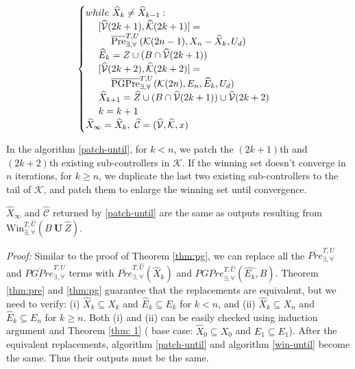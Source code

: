 {\begin{align}
\begin{split}
\begin{cases}
{\color{black} while \ \widehat{X}_{k}\not=\widehat{X}_{k-1}:}\\
\ \ \ \ [\widehat{\mathcal{V}}(2k+1),\widehat{\mathcal{K}}(2k+1)] = \\ \ \ \ \ \ \ \ \ \overline{\text{Pre}}_{\exists,\forall}^{T,U}(\mathcal{K}(2n-1),X_{n}-\widehat{X}_{k}, U_d)\\
\ \ \ \ \widehat{E}_k =  Z\cup (B\cap \widehat{\mathcal{V}}(2k+1))\\
\ \ \ \ [\widehat{\mathcal{V}}(2k+2),\widehat{\mathcal{K}}(2k+2)] =\\ 
\ \ \ \ \ \ \ \ \overline{\text{PGPre}}_{\exists,\forall}^{T,U}(\mathcal{K}(2n),E_n, \widehat{E}_k,U_d)\\
\ \ \ \ \widehat{X}_{k+1} =\widehat{Z}\cup (B\cap \widehat{\mathcal{V}}(2k+1)) \cup \widehat{\mathcal{V}}(2k+2)\\
\ \ \ \ {\color{black} k=k+1}\\
\widehat{X}_\infty = \widehat{X}_k,\ \widehat{\mathcal{C}} = (\widehat{\mathcal{V}},\widehat{\mathcal{K}},x)
\end{cases} \label{patch-until}
\end{split}
\end{align}}

In the algorithm \eqref{patch-until}, for $ k <n $, we patch the $ (2k+1) $th and $ (2k+2) $th existing sub-controllers in $ \mathcal{K} $. If the winning set doesn't converge in $ n $ iterations, for $ k\geq n $, we duplicate the last two existing sub-controllers to the tail of $ \mathcal{K} $, and patch them to enlarge the winning set until convergence. 
\begin{theorem}
	$ \widehat{X}_\infty $ and $ \widehat{\mathcal{C}} $ returned by \eqref{patch-until} are the same as outputs resulting from $ \text{Win}_{\exists,\forall}^{T,\widehat{U}}(B\mathbf{\ U\ }\widehat{Z}). $\label{thm:until}	
\end{theorem}

\emph{Proof:} Similar to the proof of Theorem \ref{thm:pg}, we can replace all the $ \overline{Pre}_{\exists,\forall}^{T,U} $ and $ \overline{PGPre}_{\exists,\forall}^{T,U} $ terms with $ \overline{Pre}_{\exists,\forall}^{T,\widehat{U}}(\widehat{X}_k) $ and $PGPre_{\exists,\forall}^{T,\widehat{U}}(\widehat{E_k},B)$. Theorem \ref{thm:pre} and \ref{thm:pg} guarantee that the replacements are equivalent, but we need to verify: (i) $ \widehat{X}_k \subseteq X_k $ and $ \widehat{E}_k \subseteq E_k $ for $ k < n $, and (ii) $ \widehat{X}_k \subseteq X_n $ and $ \widehat{E}_k \subseteq E_n $ for $ k\geq n $. Both (i) and (ii) can be easily checked using induction argument and Theorem \ref{thm: 1} ( base case: $ \widehat{X}_0\subseteq X_0 $ and $ \widehat{E}_1\subseteq E_1 $). After the equivalent replacements, algorithm \eqref{patch-until} and algorithm \eqref{win-until} become the same. Thus their outputs must be the same. \QEDB


